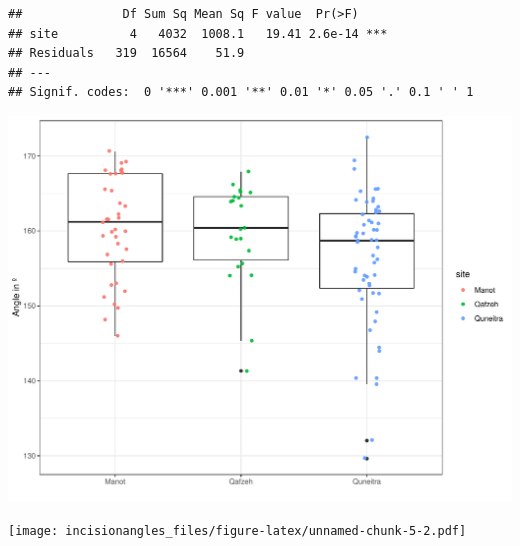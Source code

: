 \documentclass[
]{article}
\newenvironment{Shaded}{\begin{snugshade}}{\end{snugshade}}
\newcommand{\CommentTok}[1]{\textcolor[rgb]{0.56,0.35,0.01}{\textit{#1}}}
\newcommand{\FunctionTok}[1]{\textcolor[rgb]{0.13,0.29,0.53}{\textbf{#1}}}
\newcommand{\NormalTok}[1]{#1}
\newcommand{\SpecialCharTok}[1]{\textcolor[rgb]{0.81,0.36,0.00}{\textbf{#1}}}
\begin{document}
\begin{verbatim}
##              Df Sum Sq Mean Sq F value  Pr(>F)    
## site          4   4032  1008.1   19.41 2.6e-14 ***
## Residuals   319  16564    51.9                    
## ---
## Signif. codes:  0 '***' 0.001 '**' 0.01 '*' 0.05 '.' 0.1 ' ' 1
\end{verbatim}

\begin{Shaded}
\end{Shaded}

\includegraphics{incisionangles_files/figure-latex/unnamed-chunk-5-1.pdf}

\begin{Shaded}
\end{Shaded}

\texttt{[image: incisionangles\_files/figure-latex/unnamed-chunk-5-2.pdf]}

\begin{Shaded}
\end{Shaded}
\end{document}
